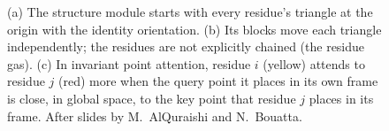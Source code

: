 \begin{figure}[!htbp]
  \caption{(a) The structure module starts with every residue's triangle at the origin with the identity orientation. (b) Its blocks move each triangle independently; the residues are not explicitly chained (the residue gas). (c) In invariant point attention, residue $i$ (yellow) attends to residue $j$ (red) more when the query point it places in its own frame is close, in global space, to the key point that residue $j$ places in its frame. After slides by M.~AlQuraishi and N.~Bouatta.}
  \label{fig:residue_gas}
\end{figure}

